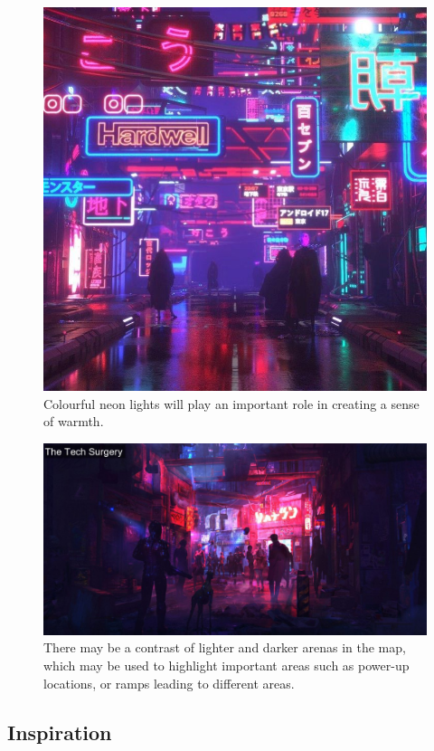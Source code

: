 \documentclass{article}
\theoremstyle{definition}
\begin{document}
\begin{figure}[htpb]
  \centering
  \includegraphics[width=0.8\linewidth]{images/theme02.jpg}
  \caption{Colourful neon lights will play an important role in creating
  a sense of warmth.}
\label{fig:theme02}
\end{figure}

\begin{figure}[htpb]
  \centering
  \includegraphics[width=0.8\linewidth]{images/theme03.jpg}
  \caption{There may be a contrast of lighter and darker arenas in the map,
  which may be used to highlight important areas such as power-up locations, or
ramps leading to different areas.}
\label{fig:theme03}
\end{figure}

\subsection{Inspiration}
\end{document}
